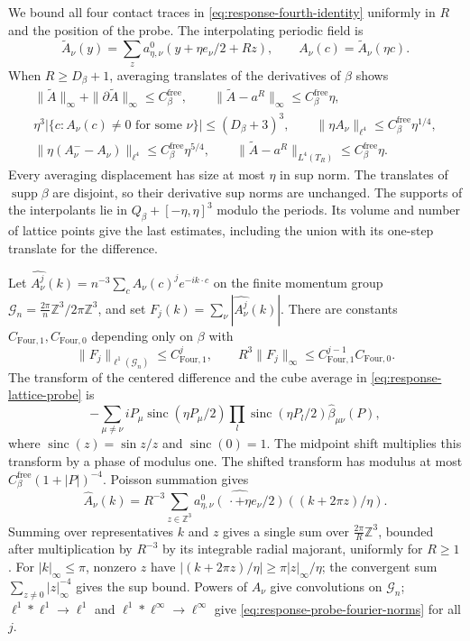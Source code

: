 \documentclass[11pt,letterpaper,reqno]{amsart}
\newcommand{\Z}{\mathbb Z}
\DeclareMathOperator{\supp}{supp}
\begin{document}
We bound all four contact traces in
\eqref{eq:response-fourth-identity} uniformly in $R$ and the
position of the probe. The interpolating periodic field is
\[
 \widetilde A_\nu(y)=\sum_z
             a_{\eta,\nu}^0(y+\eta e_\nu/2+Rz),
 \qquad A_\nu(c)=\widetilde A_\nu(\eta c).
\]
When $R\ge D_\beta+1$, averaging translates of the derivatives
of $\beta$ shows
\begin{equation}\label{eq:response-probe-estimates}
 \begin{gathered}
 \|\widetilde A\|_\infty+\|\partial\widetilde A\|_\infty\le C_\beta^{\mathrm{free}},
 \qquad \|\widetilde A-a^R\|_\infty\le C_\beta^{\mathrm{free}}\eta,\\
 \eta^3|\{c:A_\nu(c)\ne0\text{ for some }\nu\}|\le(D_\beta+3)^3,
 \qquad
 \|\eta A_\nu\|_{\ell^4}\le C_\beta^{\mathrm{free}}\eta^{1/4},\\
 \|\eta(A_\nu^--A_\nu)\|_{\ell^4}\le C_\beta^{\mathrm{free}}\eta^{5/4},
 \qquad\|\widetilde A-a^R\|_{L^4(T_R)}\le C_\beta^{\mathrm{free}}\eta.
 \end{gathered}
\end{equation}
Every averaging displacement has size at most $\eta$ in
sup norm. The translates of $\supp\beta$ are disjoint,
so their derivative sup norms are unchanged. The supports
of the interpolants lie in $Q_\beta+[-\eta,\eta]^3$ modulo
the periods. Its volume and number of lattice points give
the last estimates, including the union with its one-step
translate for the difference.

Let $\widehat{A_\nu^j}(k)=n^{-3}\sum_cA_\nu(c)^je^{-ik\cdot c}$
on the finite momentum group $\mathcal G_n=\frac{2\pi}{n}\Z^3/
2\pi\Z^3$, and set $F_j(k)=\sum_\nu|\widehat{A_\nu^j}(k)|$.
There are constants $C_{\mathrm{Four},1},C_{\mathrm{Four},0}$ depending only on $\beta$ with
\begin{equation}\label{eq:response-probe-fourier-norms}
 \|F_j\|_{\ell^1(\mathcal G_n)}\le C_{\mathrm{Four},1}^j,
 \qquad R^3\|F_j\|_\infty\le C_{\mathrm{Four},1}^{j-1}C_{\mathrm{Four},0}.
\end{equation}
The transform of the centered difference and the cube average
in \eqref{eq:response-lattice-probe} is
\[
 -\sum_{\mu\ne\nu}iP_\mu\operatorname{sinc}(\eta P_\mu/2)
 \prod_l\operatorname{sinc}(\eta P_l/2)\widehat\beta_{\mu\nu}(P),
\]
where $\operatorname{sinc}(z)=\sin z/z$ and $\operatorname{sinc}(0)=1$.
The midpoint shift multiplies this transform by a phase of modulus one.
The shifted transform has modulus at most
$C_\beta^{\mathrm{free}}(1+|P|)^{-4}$. Poisson summation \cite[Theorems~4--7]{GuthFourier2015} gives
\[
 \widehat A_\nu(k)=R^{-3}\sum_{z\in\Z^3}
      \widehat{a_{\eta,\nu}^0(\,\cdot+\eta e_\nu/2)}
                                      ((k+2\pi z)/\eta).
\]
Summing over representatives $k$ and $z$ gives a single
sum over $\frac{2\pi}{R}\Z^3$, bounded after multiplication
by $R^{-3}$ by its integrable radial majorant, uniformly
for $R\ge1$. For $|k|_\infty\le\pi$, nonzero $z$ have
$|(k+2\pi z)/\eta|\ge\pi|z|_\infty/\eta$; the convergent
sum $\sum_{z\ne0}|z|_\infty^{-4}$ gives the sup bound.
Powers of $A_\nu$ give convolutions on $\mathcal G_n$;
$\ell^1*\ell^1\to\ell^1$ and $\ell^1*\ell^\infty\to\ell^\infty$
give \eqref{eq:response-probe-fourier-norms} for all $j$.
\end{document}
